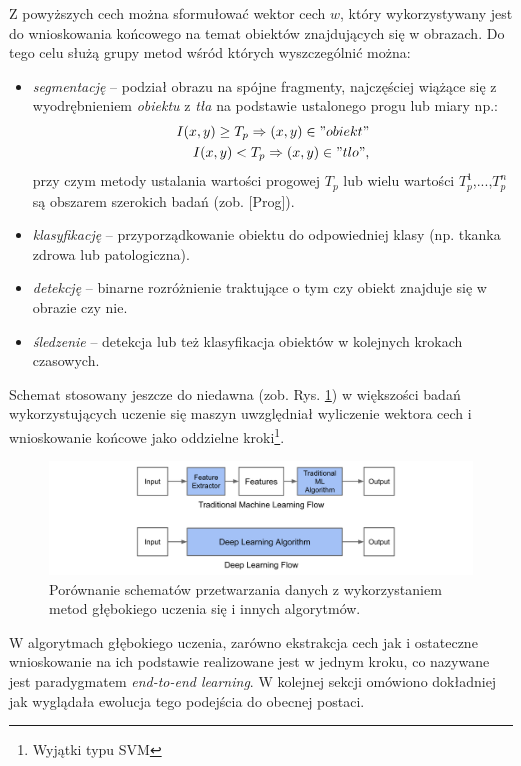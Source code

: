 Z powyższych cech można sformułować wektor cech $w$, który wykorzystywany jest do wnioskowania końcowego na temat obiektów znajdujących się w obrazach. Do tego celu służą grupy metod wśród których wyszczególnić można:
\begin{itemize}
	\item \textit{segmentację} -- podział obrazu na spójne fragmenty, najczęściej wiążące się z wyodrębnieniem \textit{obiektu} z \textit{tła} na podstawie ustalonego progu lub miary np.:
	\begin{equation*}
	\begin{aligned}
	I(x,y) \geq T_p \Rightarrow (x,y) \in "obiekt" \\
	I(x,y) < T_p \Rightarrow (x,y) \in "tlo",
	\end{aligned}
	\end{equation*} 
	przy czym metody ustalania wartości progowej $T_p$ lub wielu wartości {$T_p^1$,...,$T_p^n$} są obszarem szerokich badań (zob. [Prog]).
	\item \textit{klasyfikację} -- przyporządkowanie obiektu do odpowiedniej klasy (np. tkanka zdrowa lub patologiczna).
	\item \textit{detekcję} -- binarne rozróżnienie traktujące o tym czy obiekt znajduje się w obrazie czy nie.
	\item \textit{śledzenie} -- detekcja lub też klasyfikacja obiektów w kolejnych krokach czasowych.
\end{itemize} 

Schemat stosowany jeszcze do niedawna (zob. Rys. \ref{DLworkflow}) w większości badań wykorzystujących uczenie się maszyn uwzględniał  wyliczenie wektora cech i wnioskowanie końcowe jako oddzielne kroki\footnote{Wyjątki typu SVM}.
\begin{figure}[h!]
	\centering
	\includegraphics[width=1\textwidth]{figures/DLworkflow.png}
	\caption{Porównanie schematów przetwarzania danych z wykorzystaniem metod głębokiego uczenia się i innych algorytmów.}
	\label{DLworkflow}
\end{figure}

W algorytmach głębokiego uczenia, zarówno ekstrakcja cech jak i ostateczne wnioskowanie na ich podstawie realizowane jest w jednym kroku, co nazywane jest paradygmatem \textit{end-to-end learning}. W kolejnej sekcji omówiono dokładniej jak wyglądała ewolucja tego podejścia do obecnej postaci. 

